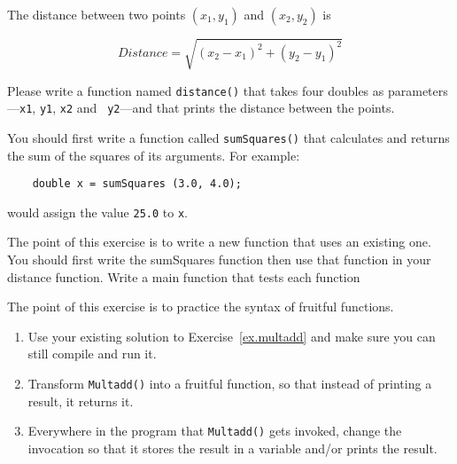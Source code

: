 \begin{exercise}
The distance between two points $(x_1, y_1)$ and $(x_2, y_2)$
is

\[Distance = \sqrt{(x_2 - x_1)^2 + (y_2 - y_1)^2} \]

Please write a function named {\tt distance()} that takes four
doubles as parameters---{\tt x1}, {\tt y1}, {\tt x2} and {\tt
y2}---and that prints the distance between the points.

You should first write a function called  {\tt sumSquares()}
that calculates and returns the sum of the squares of its arguments.
For example:

\begin{verbatim}
    double x = sumSquares (3.0, 4.0);
\end{verbatim}
%
would assign the value {\tt 25.0} to {\tt x}.

The point of this exercise is to write a new function that uses an
existing one.  You should first write the sumSquares function then use that function in your distance function.  Write a main function that tests each function
\end{exercise}


\begin{exercise}
The point of this exercise is to practice the syntax of fruitful
functions.

\begin{enumerate}

\item Use your existing solution to Exercise~\ref{ex.multadd} and make sure
you can still compile and run it.

\item Transform {\tt Multadd()} into a fruitful function, so
that instead of printing a result, it returns it.

\item Everywhere in the program that {\tt Multadd()} gets
invoked, change the invocation so that it stores the
result in a variable and/or prints the result.

\end{enumerate}
\end{exercise}


